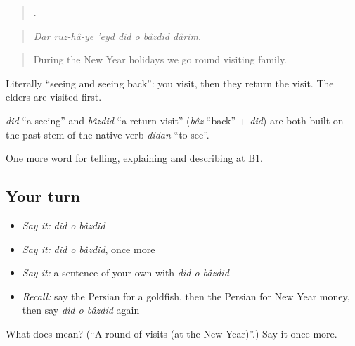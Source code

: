 \begin{quote}
      .
\end{quote}

\begin{quote}
\emph{Dar ruz-hâ-ye 'eyd did o bâzdid dârim.}
\end{quote}

\begin{quote}
During the New Year holidays we go round visiting family.
\end{quote}

Literally \textquotedblleft{}seeing and seeing back\textquotedblright{}: you visit, then they return the visit. The elders are visited first.

\begin{cousinweb}
\emph{did} \textquotedblleft{}a seeing\textquotedblright{} and \emph{bâzdid} \textquotedblleft{}a return visit\textquotedblright{} (\emph{bâz} \textquotedblleft{}back\textquotedblright{} + \emph{did}) are both built on the past stem of the native verb \emph{didan} \textquotedblleft{}to see\textquotedblright{}.
\end{cousinweb}

\begin{grammarlens}[title={What you've built}]
One more word for telling, explaining and describing at B1.
\end{grammarlens}

\subsection*{Your turn}
\begin{itemize}
\raggedright
  \item \emph{Say it:} \emph{did o bâzdid}
  \item \emph{Say it:} \emph{did o bâzdid}, once more
  \item \emph{Say it:} a sentence of your own with \emph{did o bâzdid}
  \item \emph{Recall:} say the Persian for a goldfish, then the Persian for New Year money, then say \emph{did o bâzdid} again
\end{itemize}

\begin{tcolorbox}[breakable,colback=teal!4,colframe=teal!35!black,title={Before you move on}]
What does    mean? (\textquotedblleft{}A round of visits (at the New Year)\textquotedblright{}.) Say it once more.
\end{tcolorbox}
